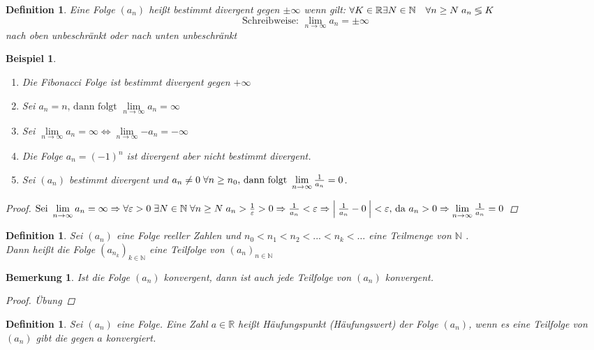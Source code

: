 \documentclass[a4paper,titlepage,oneside]{article}
\def\N{\ensuremath{\mathbb{N}} }
\def\R{\ensuremath{\mathbb{R}} }
\renewcommand{\epsilon}{\ensuremath{\varepsilon}}
\def\sp{\hspace{0,1cm}}
\renewcommand{\liminf}[2][n]{\ensuremath{\lim\limits_{#1 \rightarrow \infty}{#2}}}
\newcommand{\abs}[1]{\ensuremath{\left|\:#1\:\right|}}
\theoremstyle{thmstyle}
\newtheorem{defi}[satz]{Definition}
\newtheorem{bsp}[satz]{Beispiel}
\newtheorem{bem}[satz]{Bemerkung}
\begin{document}
\begin{defi}
Eine Folge \((a_n)\) heißt bestimmt divergent gegen \(\pm \infty \) wenn gilt: \(\forall K \in \R \exists N \in \N \quad \forall n \ge N \sp a_n \lessgtr K \)
\[\text{Schreibweise: }\liminf{a_n} = \pm \infty \]
nach oben unbeschränkt oder nach unten unbeschränkt
\end{defi}

\begin{bsp}
\begin{enumerate}
\item Die Fibonacci Folge ist bestimmt divergent gegen \(+ \infty\)
\item Sei \(a_n = n\text{, dann folgt }\liminf{a_n} = \infty\)
\item Sei \(\liminf{a_n} = \infty \Leftrightarrow \liminf{-a_n} = - \infty\)
\item Die Folge \(a_n = (-1)^n\) ist divergent aber nicht bestimmt divergent.
\item Sei \((a_n)\) bestimmt divergent und \(a_n \ne 0 \sp \forall n \ge n_0\text{, dann folgt }\liminf{\frac{1}{a_n}} = 0\).
\end{enumerate}
\begin{proof}
\(\text{Sei } \liminf{a_n} = \infty \Rightarrow \forall \epsilon > 0 \sp \exists N \in \N \sp \forall n \ge N \sp a_n > \frac{1}{\epsilon} > 0 \Rightarrow \frac{1}{a_n} < \epsilon \Rightarrow \abs{\frac{1}{a_n} - 0} < \epsilon \text{, da } a_n > 0 \Rightarrow \liminf{\frac{1}{a_n}} = 0\)
\end{proof}
\end{bsp}

\begin{defi}
Sei \((a_n)\) eine Folge reeller Zahlen und \(n_0 < n_1 < n_2 <... < n_k < \dots \) eine Teilmenge von \N.\\
Dann heißt die Folge \((a_{n_k})_{k \in \N }\) eine Teilfolge von \((a_n)_{n \in \N}\)
\end{defi}

\begin{bem}
Ist die Folge \((a_n)\) konvergent, dann ist auch jede Teilfolge von \((a_n)\) konvergent.
\begin{proof} Übung \end{proof}
\end{bem}

\begin{defi}
Sei \((a_n)\) eine Folge. Eine Zahl \(a \in \R\) heißt Häufungspunkt (Häufungswert) der Folge \((a_n)\), wenn es eine Teilfolge von \((a_n)\) gibt die gegen \(a\) konvergiert.
\end{defi}
\end{document}
